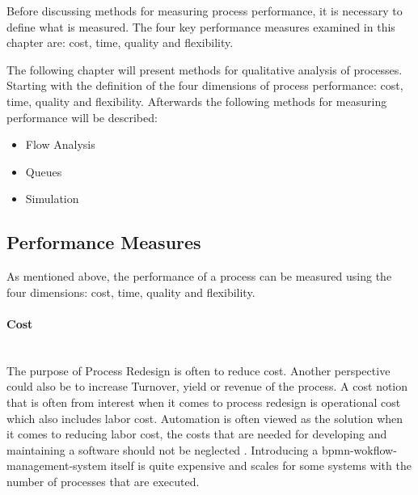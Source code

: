 Before discussing methods for measuring process performance, it is necessary to define what is measured. The four key performance measures examined in this chapter are: cost, time, quality and flexibility. \cite{fundamentals}

The following chapter will present methods for qualitative analysis of processes. Starting with the definition of the four dimensions of process performance: cost, time, quality and flexibility. Afterwards the following methods for measuring performance will be described: 

\begin{itemize}
	\item Flow Analysis
	\item Queues
	\item Simulation
\end{itemize}
\subsection{Performance Measures}
As mentioned above, the performance of a process can be measured using the four dimensions:  cost, time, quality and flexibility. 
\paragraph{Cost}~\\
The purpose of Process Redesign is often to reduce cost. Another perspective could also be to increase Turnover, yield or revenue  of the process. A cost notion that is often from interest when it comes to process redesign is operational cost which also includes labor cost. Automation is often viewed as the solution when it comes to reducing labor cost, the costs that are needed for developing and maintaining a software should not be neglected \cite{fundamentals}. Introducing a \gls{bpmn-wokflow-management-system} itself is quite expensive and scales for some systems with the number of processes that are executed. 
